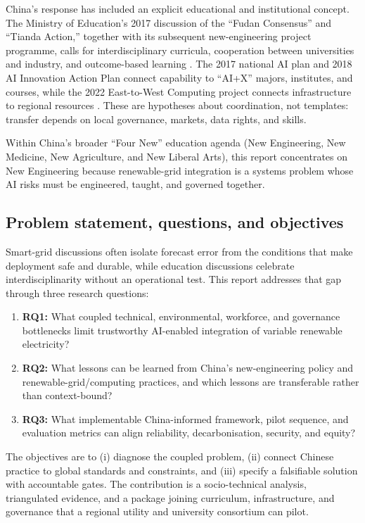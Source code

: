 \documentclass[12pt]{article}
\begin{document}
China's response has included an explicit educational and institutional concept. The Ministry of Education's 2017 discussion of the ``Fudan Consensus'' and ``Tianda Action,'' together with its subsequent new-engineering project programme, calls for interdisciplinary curricula, cooperation between universities and industry, and outcome-based learning \citep{moe2017,moemiit2018}. The 2017 national AI plan and 2018 AI Innovation Action Plan connect capability to ``AI+X'' majors, institutes, and courses, while the 2022 East-to-West Computing project connects infrastructure to regional resources \citep{statecouncil2017,moeai2018,ndrc2022}. These are hypotheses about coordination, not templates: transfer depends on local governance, markets, data rights, and skills.

Within China's broader ``Four New'' education agenda (New Engineering, New Medicine, New Agriculture, and New Liberal Arts), this report concentrates on New Engineering because renewable-grid integration is a systems problem whose AI risks must be engineered, taught, and governed together.

\subsection{Problem statement, questions, and objectives}
Smart-grid discussions often isolate forecast error from the conditions that make deployment safe and durable, while education discussions celebrate interdisciplinarity without an operational test. This report addresses that gap through three research questions:

\begin{enumerate}
  \item \textbf{RQ1:} What coupled technical, environmental, workforce, and governance bottlenecks limit trustworthy AI-enabled integration of variable renewable electricity?
  \item \textbf{RQ2:} What lessons can be learned from China's new-engineering policy and renewable-grid/computing practices, and which lessons are transferable rather than context-bound?
  \item \textbf{RQ3:} What implementable China-informed framework, pilot sequence, and evaluation metrics can align reliability, decarbonisation, security, and equity?
\end{enumerate}

The objectives are to (i) diagnose the coupled problem, (ii) connect Chinese practice to global standards and constraints, and (iii) specify a falsifiable solution with accountable gates. The contribution is a socio-technical analysis, triangulated evidence, and a package joining curriculum, infrastructure, and governance that a regional utility and university consortium can pilot.
\end{document}
